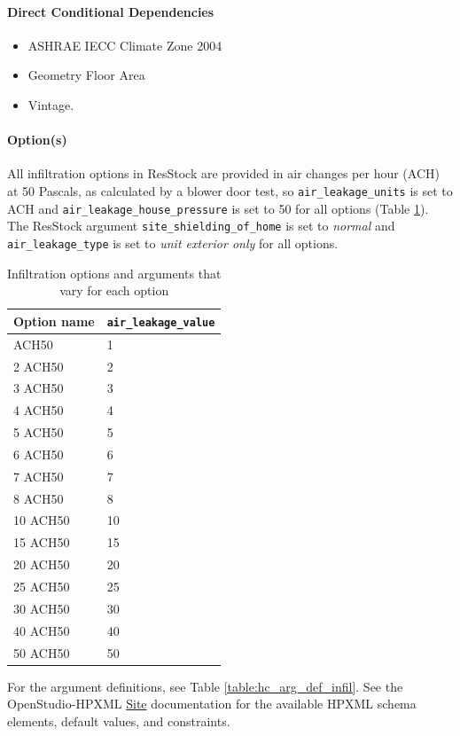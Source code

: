 \paragraph{Direct Conditional Dependencies}
 
\begin{itemize}
    \item ASHRAE IECC Climate Zone 2004
    \item Geometry Floor Area
    \item Vintage.
\end{itemize}
\paragraph{Option(s)}
All infiltration options in ResStock are provided in air changes per hour (ACH) at 50 Pascals, as calculated by a blower door test, so \texttt{air\_leakage\_units} is set to ACH and \texttt{air\_leakage\_house\_pressure} is set to 50 for all options (Table \ref{table:hc_opt_infil}). The ResStock argument
\texttt{site\_shielding\_of\_home} is set to \textit{normal} and 
 \texttt{air\_leakage\_type} is set to \textit{unit exterior only} for all options.
 
\begin{longtable}[]{|p{}|p{3.5cm}|} \caption{Infiltration options and arguments that vary for each option} \label{table:hc_opt_infil} \\  
\toprule\noalign{}
Option name & 

\texttt{air\_leakage\_value}  \\
\midrule\noalign{}
\endhead
\bottomrule\noalign{}
\endlastfoot
1 ACH50 & 1  \\
2 ACH50 & 2  \\
3 ACH50 & 3 \\
4 ACH50 & 4  \\
5 ACH50 & 5 \\
6 ACH50 & 6\\
7 ACH50 & 7\\
8 ACH50 & 8  \\
10 ACH50 & 10  \\
15 ACH50 & 15  \\
20 ACH50 & 20  \\
25 ACH50 & 25  \\
30 ACH50 & 30  \\
40 ACH50 & 40  \\
50 ACH50 & 50  \\
\end{longtable}
For the argument definitions, see Table \ref{table:hc_arg_def_infil}. See the OpenStudio-HPXML \href{https://openstudio-hpxml.readthedocs.io/en/v1.8.1/workflow_inputs.html##hpxml-site}{Site} documentation for the available HPXML schema elements, default values, and constraints.

